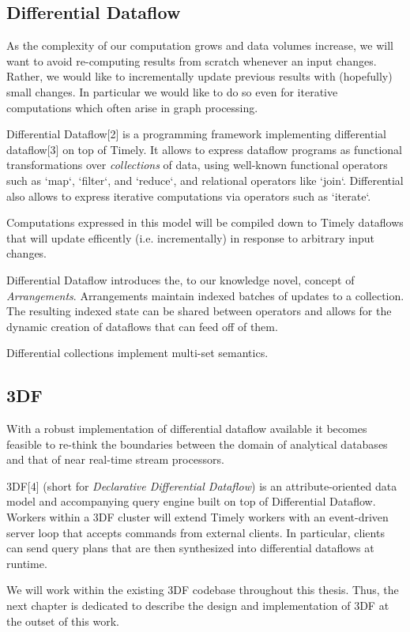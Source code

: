 \documentclass[../index.tex]{subfiles}
\begin{document}
\subsection{Differential Dataflow}

As the complexity of our computation grows and data volumes increase,
we will want to avoid re-computing results from scratch whenever an
input changes. Rather, we would like to incrementally update previous
results with (hopefully) small changes. In particular we would like to
do so even for iterative computations which often arise in graph
processing.

Differential Dataflow[2] is a programming framework implementing
differential dataflow[3] on top of Timely. It allows to express
dataflow programs as functional transformations over
\emph{collections} of data, using well-known functional operators such
as `map`, `filter`, and `reduce`, and relational operators like
`join`. Differential also allows to express iterative computations via
operators such as `iterate`.

Computations expressed in this model will be compiled down to Timely
dataflows that will update efficently (i.e. incrementally) in response
to arbitrary input changes.

Differential Dataflow introduces the, to our knowledge novel, concept
of \emph{Arrangements}. Arrangements maintain indexed batches of
updates to a collection. The resulting indexed state can be shared
between operators and allows for the dynamic creation of dataflows
that can feed off of them.

Differential collections implement multi-set semantics.

\subsection{3DF}

With a robust implementation of differential dataflow available it
becomes feasible to re-think the boundaries between the domain of
analytical databases and that of near real-time stream processors.

3DF[4] (short for \emph{Declarative Differential Dataflow}) is an
attribute-oriented data model and accompanying query engine built on
top of Differential Dataflow. Workers within a 3DF cluster will extend
Timely workers with an event-driven server loop that accepts commands
from external clients. In particular, clients can send query plans
that are then synthesized into differential dataflows at runtime.

We will work within the existing 3DF codebase throughout this
thesis. Thus, the next chapter is dedicated to describe the design and
implementation of 3DF at the outset of this work.
\end{document}
